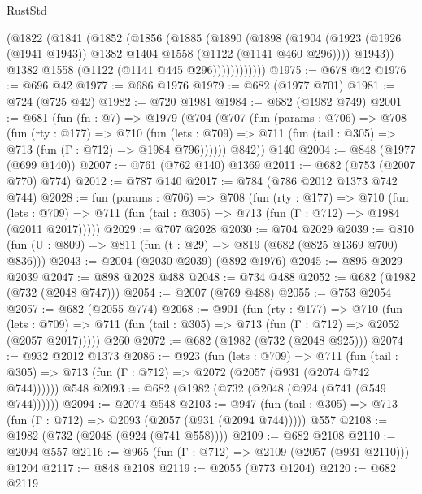\begin{lexlean}{RustStd}
\begin{coremodule}
              (@1822
                (@1841
                  (@1852
                    (@1856
                      (@1885
                        (@1890
                          (@1898
                            (@1904
                              (@1923
                                (@1926 (@1941 @1943))
                                @1382
                                @1404
                                @1558
                                (@1122 (@1141 @460 @296))))
                            @1943))
                        @1382
                        @1558
                        (@1122 (@1141 @445 @296))))))))))))
@1975 := @678 @42
@1976 := @696 @42
@1977 := @686 @1976
@1979 := @682 (@1977 @701)
@1981 := @724 (@725 @42)
@1982 := @720 @1981
@1984 := @682 (@1982 @749)
@2001 := @681
    (fun (fn : @7) =>
    @1979
      (@704
        (@707
          (fun (params : @706) =>
          @708
            (fun (rty : @177) =>
            @710
              (fun (lets : @709) =>
              @711 (fun (tail : @305) => @713 (fun (Γ : @712) => @1984 @796))))))
        @842))
    @140
@2004 := @848 (@1977 (@699 @140))
@2007 := @761 (@762 @140) @1369
@2011 := @682 (@753 (@2007 @770) @774)
@2012 := @787 @140
@2017 := @784 (@786 @2012 @1373 @742 @744)
@2028 := fun (params : @706) =>
  @708
    (fun (rty : @177) =>
    @710
      (fun (lets : @709) =>
      @711 (fun (tail : @305) => @713 (fun (Γ : @712) => @1984 (@2011 @2017)))))
@2029 := @707 @2028
@2030 := @704 @2029
@2039 := @810 (fun (U : @809) => @811 (fun (t : @29) => @819 (@682 (@825 @1369 @700) @836)))
@2043 := @2004 (@2030 @2039) (@892 @1976)
@2045 := @895 @2029 @2039
@2047 := @898 @2028 @488
@2048 := @734 @488
@2052 := @682 (@1982 (@732 (@2048 @747)))
@2054 := @2007 (@769 @488)
@2055 := @753 @2054
@2057 := @682 (@2055 @774)
@2068 := @901
    (fun (rty : @177) =>
    @710
      (fun (lets : @709) =>
      @711 (fun (tail : @305) => @713 (fun (Γ : @712) => @2052 (@2057 @2017)))))
    @260
@2072 := @682 (@1982 (@732 (@2048 @925)))
@2074 := @932 @2012 @1373
@2086 := @923
    (fun (lets : @709) =>
    @711 (fun (tail : @305) => @713 (fun (Γ : @712) => @2072 (@2057 (@931 (@2074 @742 @744))))))
    @548
@2093 := @682 (@1982 (@732 (@2048 (@924 (@741 (@549 @744))))))
@2094 := @2074 @548
@2103 := @947 (fun (tail : @305) => @713 (fun (Γ : @712) => @2093 (@2057 (@931 (@2094 @744))))) @557
@2108 := @1982 (@732 (@2048 (@924 (@741 @558))))
@2109 := @682 @2108
@2110 := @2094 @557
@2116 := @965 (fun (Γ : @712) => @2109 (@2057 (@931 @2110))) @1204
@2117 := @848 @2108
@2119 := @2055 (@773 @1204)
@2120 := @682 @2119

\end{coremodule}
\end{lexlean}
